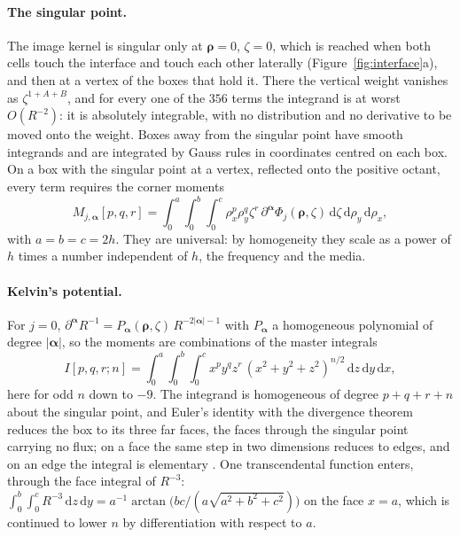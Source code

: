 \documentclass[11pt,a4paper]{article}
\newcommand{\balpha}{\boldsymbol{\alpha}}
\newcommand{\brho}{\boldsymbol{\rho}}
\newcommand{\dd}{\mathrm{d}}
\begin{document}
\paragraph{The singular point.} The image kernel is singular only at $\brho=0$, $\zeta=0$, which is reached
when both cells touch the interface and touch each other laterally (Figure~\ref{fig:interface}a), and then at
a vertex of the boxes that hold it. There the vertical weight vanishes as $\zeta^{1+A+B}$, and for every one
of the $356$ terms the integrand is at worst $O(R^{-2})$: it is absolutely integrable, with no distribution
and no derivative to be moved onto the weight. Boxes away from the singular point have smooth integrands
and are integrated by Gauss rules in coordinates centred on each box. On a box with the singular point at
a vertex, reflected onto the positive octant, every term requires the corner moments
\begin{equation}\label{eq:cornermoment}
  M_{j,\balpha}[p,q,r]=\int_0^a\!\!\int_0^b\!\!\int_0^c\rho_x^p\rho_y^q\zeta^r\,
  \partial^{\balpha}\Phi_j(\brho,\zeta)\,\dd\zeta\,\dd\rho_y\,\dd\rho_x,
\end{equation}
with $a=b=c=2h$. They are universal: by homogeneity they scale as a power of $h$ times a number independent
of $h$, the frequency and the media.

\paragraph{Kelvin's potential.} For $j=0$, $\partial^{\balpha}R^{-1}=P_{\balpha}(\brho,\zeta)\,R^{-2|\balpha|-1}$
with $P_{\balpha}$ a homogeneous polynomial of degree $|\balpha|$, so the moments are combinations of the master
integrals
\begin{equation}\label{eq:boxI}
  I[p,q,r;n]=\int_0^a\!\!\int_0^b\!\!\int_0^c x^py^qz^r\,(x^2+y^2+z^2)^{n/2}\,\dd z\,\dd y\,\dd x,
\end{equation}
here for odd $n$ down to $-9$. The integrand is homogeneous of degree $p+q+r+n$ about the singular point,
and Euler's identity with the divergence theorem reduces the box to its three far faces, the faces through
the singular point carrying no flux; on a face the same step in two dimensions reduces to edges, and on an
edge the integral is elementary \citep{NestorCoupling2026}. One transcendental function enters, through the
face integral of $R^{-3}$: $\int_0^b\!\int_0^cR^{-3}\,\dd z\,\dd y=a^{-1}\arctan\bigl(bc/(a\sqrt{a^2+b^2+c^2})\bigr)$
on the face $x=a$, which is continued to lower $n$ by differentiation with respect to $a$.
\end{document}
